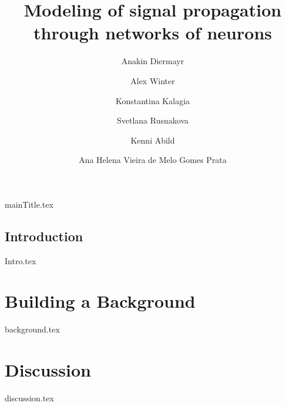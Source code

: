 \documentclass[printGloss, printBibble]{myRUCProject}
\title{Modeling of signal propagation through networks of neurons}
\author{ Anakin Diermayr \and  Alex Winter \and Konstantina Kalagia \and Svetlana Rusnakova \and Kenni Abild \and  Ana Helena Vieira de Melo Gomes Prata }
\begin{document}


{mainTitle.tex}


{%
\setlength{\parskip}{0.5ex} %
\tableofcontents%

\printacronyms%

\listoftodos
}










\newpage
{}
\chapter*{Introduction} 
{Intro.tex}

\part{Building a Background}
{background.tex}







\newpage
\part{Discussion}
{discussion.tex}
\end{document}
